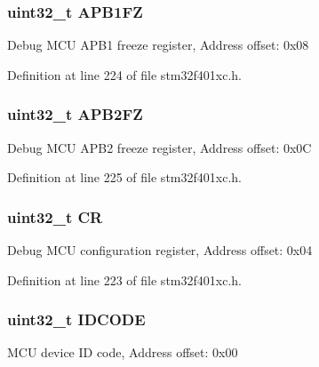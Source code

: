 \subsubsection[{\texorpdfstring{A\+P\+B1\+FZ}{APB1FZ}}]{ uint32\+\_\+t A\+P\+B1\+FZ}\hypertarget{struct_d_b_g_m_c_u___type_def_a5eaefc557573ae7bdc632ef6b6d574b5}{}\label{struct_d_b_g_m_c_u___type_def_a5eaefc557573ae7bdc632ef6b6d574b5}
Debug M\+CU A\+P\+B1 freeze register, Address offset\+: 0x08 

Definition at line 224 of file stm32f401xc.\+h.

\subsubsection[{\texorpdfstring{A\+P\+B2\+FZ}{APB2FZ}}]{ uint32\+\_\+t A\+P\+B2\+FZ}\hypertarget{struct_d_b_g_m_c_u___type_def_a4628a8c32f97ef93b15b2b503ef90c75}{}\label{struct_d_b_g_m_c_u___type_def_a4628a8c32f97ef93b15b2b503ef90c75}
Debug M\+CU A\+P\+B2 freeze register, Address offset\+: 0x0C 

Definition at line 225 of file stm32f401xc.\+h.

\subsubsection[{\texorpdfstring{CR}{CR}}]{ uint32\+\_\+t CR}\hypertarget{struct_d_b_g_m_c_u___type_def_ab40c89c59391aaa9d9a8ec011dd0907a}{}\label{struct_d_b_g_m_c_u___type_def_ab40c89c59391aaa9d9a8ec011dd0907a}
Debug M\+CU configuration register, Address offset\+: 0x04 

Definition at line 223 of file stm32f401xc.\+h.

\subsubsection[{\texorpdfstring{I\+D\+C\+O\+DE}{IDCODE}}]{ uint32\+\_\+t I\+D\+C\+O\+DE}\hypertarget{struct_d_b_g_m_c_u___type_def_a24df28d0e440321b21f6f07b3bb93dea}{}\label{struct_d_b_g_m_c_u___type_def_a24df28d0e440321b21f6f07b3bb93dea}
M\+CU device ID code, Address offset\+: 0x00 

